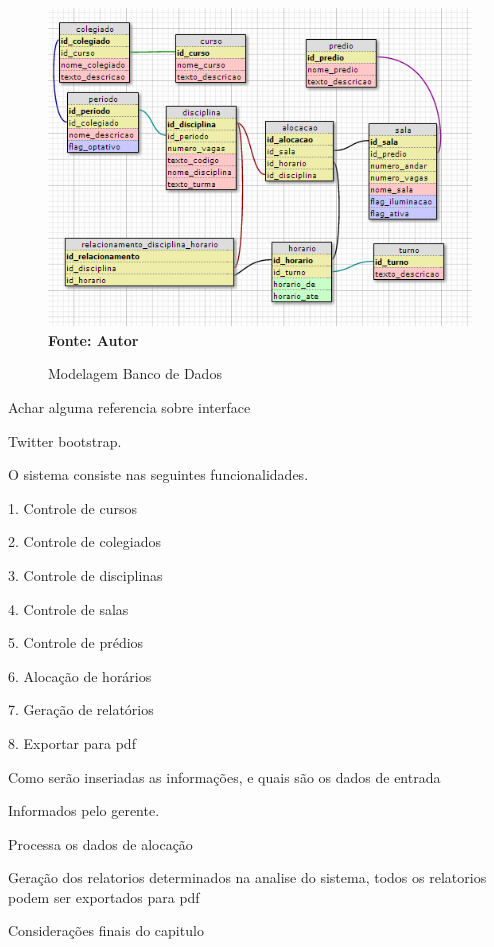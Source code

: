 \documentclass{abntpuc}
\begin{document}
		\begin{figure}[!htb]
   		\caption[Modelagem Banco de Dados]{Modelagem Banco de Dados}
   		\label{fig:figura3}
   		\centering
   		\includegraphics{modelagemBanco.png}
   		\\ \textbf{\footnotesize Fonte: Autor}
	\end{figure}


	Achar alguma referencia sobre interface
	
	Twitter bootstrap.\par


	O sistema consiste nas seguintes funcionalidades.

	1. Controle de cursos \par
	2. Controle de colegiados\par
	3. Controle de disciplinas\par
	4. Controle de salas\par
	5. Controle de prédios\par
	6. Alocação de horários\par
	7. Geração de relatórios\par
	8. Exportar para pdf\par




	Como serão inseriadas as informações, e quais são os dados de entrada

	Informados pelo gerente.


	Processa os dados de alocação


	Geração dos relatorios determinados na analise do sistema, todos os relatorios podem ser exportados para pdf


Considerações finais do capitulo





\end{document}
